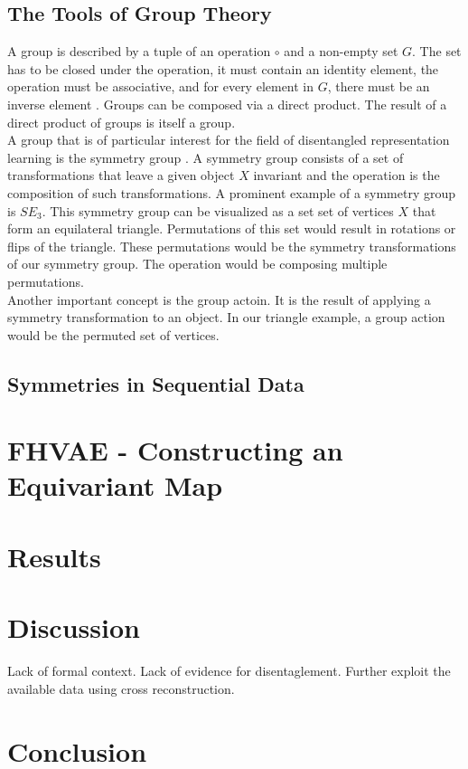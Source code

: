 \documentclass{article} %
\begin{document}
\subsection*{The Tools of Group Theory}
A group is described by a tuple of an operation $\circ$ and a non-empty set $G$. The set has to be closed under the operation, it must contain an identity element, the operation must be associative, and for every element in $G$, there must be an inverse element \cite{benkart1987abstract}.
Groups can be composed via a direct product. The result of a direct product of groups is itself a group.\\
 A group that is of particular interest for the field of disentangled representation learning is the symmetry group \cite{benkart1987abstract}.
A symmetry group consists of a set of transformations that leave a given object $X$ invariant and the operation is the composition of such transformations. A prominent example of a symmetry group is $SE_3$. This symmetry group can be visualized as a set set of vertices $X$ that form an equilateral triangle. Permutations of this set would result in rotations or flips of the triangle. These permutations would be the symmetry transformations of our symmetry group. The operation would be composing multiple permutations.\\
Another important concept is the group actoin. It is the result of applying a symmetry transformation to an object. In our triangle example, a group action would be the permuted set of vertices.\\




\subsection*{Symmetries in Sequential Data}




\section*{FHVAE - Constructing an Equivariant Map}


\section*{Results}


\section*{Discussion}
Lack of formal context.
Lack of evidence for disentaglement.
Further exploit the available data using cross reconstruction.

\section*{Conclusion}



\newpage


\end{document}
